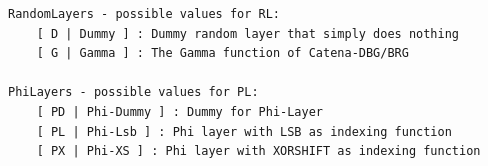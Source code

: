 \begin{appendix}
\begin{lstlisting}[]
RandomLayers - possible values for RL:
    [ D | Dummy ] : Dummy random layer that simply does nothing
    [ G | Gamma ] : The Gamma function of Catena-DBG/BRG

PhiLayers - possible values for PL:
    [ PD | Phi-Dummy ] : Dummy for Phi-Layer
    [ PL | Phi-Lsb ] : Phi layer with LSB as indexing function
    [ PX | Phi-XS ] : Phi layer with XORSHIFT as indexing function
\end{lstlisting}

% 
% 



\end{appendix}
